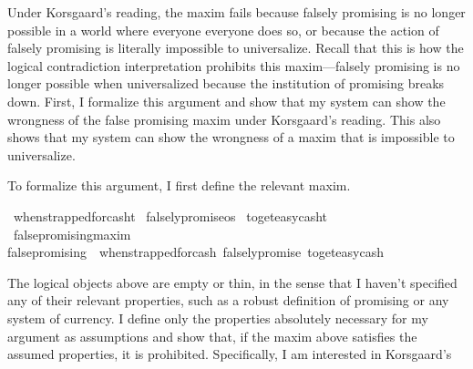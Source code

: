 \begin{isabellebody}
\begin{isamarkuptext}
Under Korsgaard's reading, the maxim fails because falsely promising is no longer possible in a world where 
everyone everyone does so, or because the action of falsely promising is literally impossible to
universalize. Recall that this is how the logical contradiction interpretation prohibits this maxim—falsely 
promising is no longer possible when universalized because the institution of promising breaks down. 
First, I formalize this argument and show that my system can show the wrongness of the false
promising maxim under Korsgaard's reading. This also shows that my system can show the wrongness of a
maxim that is impossible to universalize. 

To formalize this argument, I first define the relevant maxim.%
\end{isamarkuptext}\isamarkuptrue%
\isamarkupfalse%
\ when{\isacharunderscore}strapped{\isacharunderscore}for{\isacharunderscore}cash{\isacharcolon}{\isacharcolon}t\isanewline
%
\isanewline
{}\isamarkupfalse%
\ falsely{\isacharunderscore}promise{\isacharcolon}{\isacharcolon}os\isanewline
%
\isanewline
{}\isamarkupfalse%
\ to{\isacharunderscore}get{\isacharunderscore}easy{\isacharunderscore}cash{\isacharcolon}{\isacharcolon}t\isanewline
%
\isanewline
{}\isamarkupfalse%
\ false{\isacharunderscore}promising{\isacharcolon}{\isacharcolon}maxim\ \ \isanewline
{\isachardoublequoteopen}false{\isacharunderscore}promising\ {\isasymequiv}\ {\isacharparenleft}when{\isacharunderscore}strapped{\isacharunderscore}for{\isacharunderscore}cash{\isacharcomma}\ falsely{\isacharunderscore}promise{\isacharcomma}\ to{\isacharunderscore}get{\isacharunderscore}easy{\isacharunderscore}cash{\isacharparenright}{\isachardoublequoteclose}\isanewline
%
%
\begin{isamarkuptext}%
The logical objects above are empty or thin, in the sense that I haven't specified any of their 
relevant properties, such as a robust definition of promising or any system of currency. I define 
only the properties absolutely necessary for my argument as assumptions and show that, if the maxim 
above satisfies the assumed properties, it is prohibited. Specifically, I am interested in Korsgaard's

\end{isamarkuptext}
\end{isabellebody}
